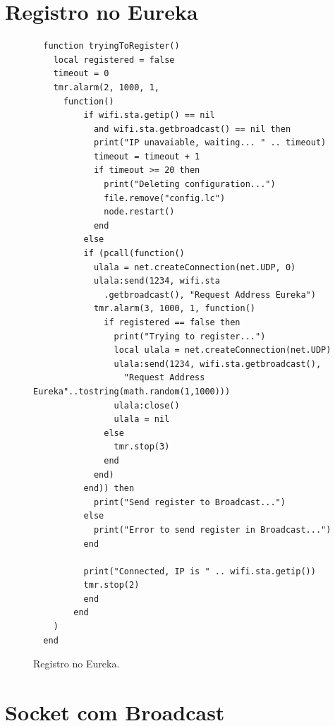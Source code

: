 \documentclass[journal]{IEEEtran}
\begin{document}
\section{Registro no Eureka}
\begin{figure}[H]
\centering

\begin{lstlisting}
  function tryingToRegister()
    local registered = false
    timeout = 0
    tmr.alarm(2, 1000, 1,
      function()
          if wifi.sta.getip() == nil 
            and wifi.sta.getbroadcast() == nil then
            print("IP unavaiable, waiting... " .. timeout)
            timeout = timeout + 1
            if timeout >= 20 then
              print("Deleting configuration...")
              file.remove("config.lc")
              node.restart()
            end
          else
          if (pcall(function()
            ulala = net.createConnection(net.UDP, 0)
            ulala:send(1234, wifi.sta
              .getbroadcast(), "Request Address Eureka")
            tmr.alarm(3, 1000, 1, function()
              if registered == false then
                print("Trying to register...")
                local ulala = net.createConnection(net.UDP)
                ulala:send(1234, wifi.sta.getbroadcast(), 
                  "Request Address Eureka"..tostring(math.random(1,1000)))
                ulala:close()
                ulala = nil
              else
                tmr.stop(3)
              end
            end)
          end)) then
            print("Send register to Broadcast...")
          else
            print("Error to send register in Broadcast...")
          end
          
          print("Connected, IP is " .. wifi.sta.getip())
          tmr.stop(2)
          end
        end
    )
  end
\end{lstlisting}
\caption{Registro no Eureka.}
\label{tryingToRegisterFN}
\end{figure}

\clearpage

\section{Socket com Broadcast}
\end{document}
